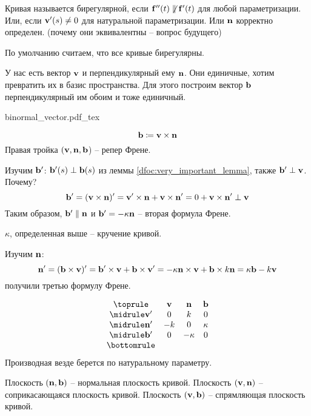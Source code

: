 \documentclass[main]{subfiles}
\begin{document}
\begin{definition}
    Кривая называется бирегулярной, если $\mathbf{f}''(t) \not\parallel \mathbf{f}'(t)$ для любой параметризации.
    Или, если $\mathbf{v}'(s) \neq 0$ для натуральной параметризации.
    Или $\mathbf{n}$ корректно определен.
    (почему они эквивалентны -- вопрос будущего)
\end{definition}

По умолчанию считаем, что все кривые бирегулярны.

У нас есть вектор $\mathbf{v}$ и перпендикулярный ему $\mathbf{n}$.
Они единичные, хотим превратить их в базис пространства.
Для этого построим вектор $\mathbf{b}$ перпендикулярный им обоим и тоже единичный.
\begin{center}
    {binormal_vector.pdf_tex}
\end{center}

\begin{definition}
    \[\mathbf{b} \coloneqq \mathbf{v} \times \mathbf{n}\]
    Правая тройка $(\mathbf{v},\mathbf{n}, \mathbf{b}$) -- репер Френе.
\end{definition}

Изучим $\mathbf{b}'$:
$\mathbf{b}'(s) \perp \mathbf{b}(s)$ из леммы \ref{dfoc:very_important_lemma},
также $\mathbf{b}' \perp \mathbf{v}$. Почему?
\[\mathbf{b}' = (\mathbf{v} \times \mathbf{n})' = \mathbf{v}' \times \mathbf{n} + \mathbf{v}\times \mathbf{n}' = 0 + \mathbf{v}\times \mathbf{n}' \perp \mathbf{v}\]
Таким образом, $\mathbf{b}' \parallel \mathbf{n}$ и $\mathbf{b}' = -\kappa \mathbf{n}$ -- вторая формула Френе.
\begin{definition}
    $\kappa$, определенная выше -- кручение кривой.
\end{definition}

Изучим $\mathbf{n}$:
\[\mathbf{n}' = (\mathbf{b} \times \mathbf{v})' = \mathbf{b}' \times \mathbf{v} + \mathbf{b} \times \mathbf{v}' = -\kappa \mathbf{n} \times \mathbf{v} + \mathbf{b} \times k\mathbf{n} = \kappa\mathbf{b} - k\mathbf{v}\]
получили третью формулу Френе.
\begin{definition}
    \[
        \begin{array}{cccc}
            \toprule
                 & \vv & \vn     & \vb    \\ \midrule
            \vv' & 0   & k       & 0      \\ \midrule
            \vn' & -k  & 0       & \kappa \\ \midrule
            \vb' & 0   & -\kappa & 0      \\
            \bottomrule
        \end{array}
    \]
    Производная везде берется по натуральному параметру.
\end{definition}
\begin{definition}
    Плоскость $(\mathbf{n}, \mathbf{b})$ -- нормальная плоскость кривой.
    Плоскость $(\mathbf{v}, \mathbf{n})$ -- соприкасающаяся плоскость кривой.
    Плоскость $(\mathbf{v}, \mathbf{b})$ -- спрямляющая плоскость кривой.
\end{definition}
\end{document}
